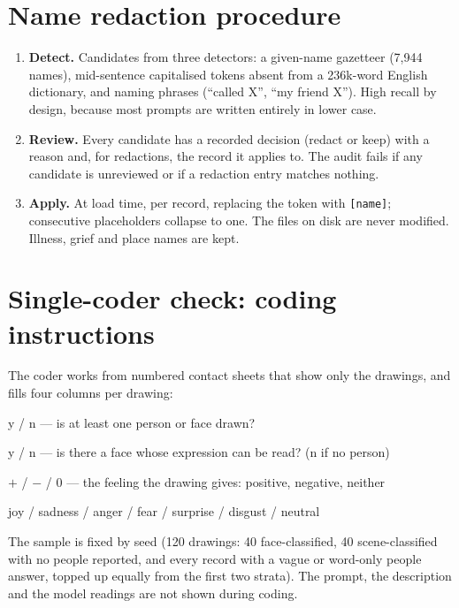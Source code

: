 \section{Name redaction procedure}
\begin{enumerate}\setlength{\itemsep}{1pt}
\item \textbf{Detect.} Candidates from three detectors: a given-name gazetteer (7,944 names), mid-sentence capitalised tokens absent from a 236k-word English dictionary, and naming phrases (``called X'', ``my friend X''). High recall by design, because most prompts are written entirely in lower case.
\item \textbf{Review.} Every candidate has a recorded decision (redact or keep) with a reason and, for redactions, the record it applies to. The audit fails if any candidate is unreviewed or if a redaction entry matches nothing.
\item \textbf{Apply.} At load time, per record, replacing the token with \texttt{[name]}; consecutive placeholders collapse to one. The files on disk are never modified. Illness, grief and place names are kept.
\end{enumerate}

\section{Single-coder check: coding instructions}
The coder works from numbered contact sheets that show only the drawings, and fills four columns per drawing:
\begin{description}\setlength{\itemsep}{1pt}
\item[person] y / n --- is at least one person or face drawn?
\item[face] y / n --- is there a face whose expression can be read? (n if no person)
\item[valence] $+$ / $-$ / 0 --- the feeling the drawing gives: positive, negative, neither
\item[family] joy / sadness / anger / fear / surprise / disgust / neutral
\end{description}
The sample is fixed by seed (120 drawings: 40 face-classified, 40 scene-classified with no people reported, and every record with a vague or word-only people answer, topped up equally from the first two strata). The prompt, the description and the model readings are not shown during coding.
